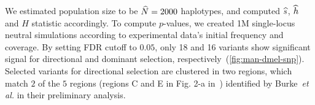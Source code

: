 We estimated population size to be $\widehat{N}=2000$ haplotypes, and computed
$\widehat{s}$, $\widehat{h}$ and $H$ statistic accordingly. To compute $p$-values, we
created 1M single-locus neutral simulations according to experimental
data's initial frequency and coverage. By setting FDR cutoff to
$0.05$, only 18 and 16 variants show significant signal for
directional and dominant selection,
respectively~(\ref{fig:man-dmel-snp}).  Selected variants for
directional selection are clustered in two regions, which match $2$ of
the $5$ regions (regions C and E in Fig. 2-a
in~\cite{burke2014standing}) identified by Burke~\emph{et al.} in
their preliminary analysis.  
